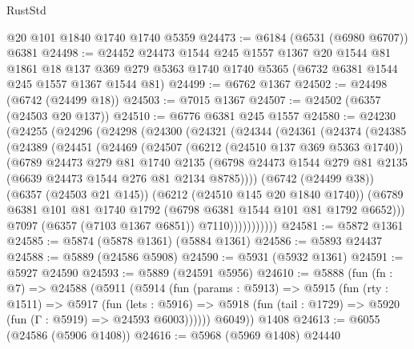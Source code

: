 \begin{lexlean}{RustStd}
\begin{coremodule}
    @20
    @101
    @1840
    @1740
    @1740
    @5359
@24473 := @6184 (@6531 (@6980 @6707)) @6381
@24498 := @24452
    @24473
    @1544
    @245
    @1557
    @1367
    @20
    @1544
    @81
    @1861
    @18
    @137
    @369
    @279
    @5363
    @1740
    @1740
    @5365
    (@6732 @6381 @1544 @245 @1557 @1367 @1544 @81)
@24499 := @6762 @1367
@24502 := @24498 (@6742 (@24499 @18))
@24503 := @7015 @1367
@24507 := @24502 (@6357 (@24503 @20 @137))
@24510 := @6776 @6381 @245 @1557
@24580 := @24230
    (@24255
      (@24296
        (@24298
          (@24300
            (@24321
              (@24344
                (@24361
                  (@24374
                    (@24385
                      (@24389
                        (@24451
                          (@24469
                            (@24507
                              (@6212 (@24510 @137 @369 @5363 @1740))
                              (@6789
                                @24473
                                @279
                                @81
                                @1740
                                @2135
                                (@6798
                                  @24473
                                  @1544
                                  @279
                                  @81
                                  @2135
                                  (@6639 @24473 @1544 @276 @81 @2134 @8785))))
                            (@6742 (@24499 @38))
                            (@6357 (@24503 @21 @145))
                            (@6212 (@24510 @145 @20 @1840 @1740))
                            (@6789
                              @6381
                              @101
                              @81
                              @1740
                              @1792
                              (@6798 @6381 @1544 @101 @81 @1792 @6652)))
                          @7097
                          (@6357 (@7103 @1367 @6851))
                          @7110)))))))))))
@24581 := @5872 @1361
@24585 := @5874 (@5878 @1361) (@5884 @1361)
@24586 := @5893 @24437
@24588 := @5889 (@24586 @5908)
@24590 := @5931 (@5932 @1361)
@24591 := @5927 @24590
@24593 := @5889 (@24591 @5956)
@24610 := @5888
    (fun (fn : @7) =>
    @24588
      (@5911
        (@5914
          (fun (params : @5913) =>
          @5915
            (fun (rty : @1511) =>
            @5917
              (fun (lets : @5916) =>
              @5918 (fun (tail : @1729) => @5920 (fun (Γ : @5919) => @24593 @6003))))))
        @6049))
    @1408
@24613 := @6055 (@24586 (@5906 @1408))
@24616 := @5968 (@5969 @1408) @24440

\end{coremodule}
\end{lexlean}
